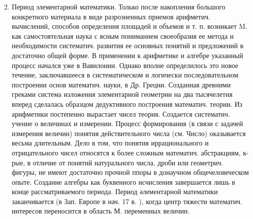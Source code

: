 \documentclass[10pt]{article}
\begin{document}
\begin{enumerate}

  \setcounter{enumi}{1}

  \item Период элементарной математики. Только после накопления большого конкретного материала в виде разрозненных приемов арифметич. вычислений, способов определения площадей и объемов и т. п. возникает M. как самостоятельная наука с ясным пониманием своеобразия ее метода и необходимости систематич. развития ее основных понятий и предложений в достаточно общей форме. В применении к арифметике и алгебре указанный процесс начался уже в Вавилонии. Однако вполне определилось это новое течение, заключавшееся в систематическом и логически последовательном построении основ математич. науки, в Др. Греции. Созданная древними греками система изложения элементарной геометрии на два тысячелетия вперед сделалась образцом дедуктивного построения математич. теории. Из арифметики постепенно вырастает чисел теория. Создается систематич. учение о величинах и измерении. Процесс формирования (в связи с задачей измерения величин) понятия действительного числа (см. Число) оказывается весьма длительным. Дело в том, что понятия иррационального и отрицательного чисел относятся к более сложным математич. абстракциям, к-рые, в отличие от понятий натурального числа, дроби или геометрич. фигуры, не имеют достаточно прочной ппоры в донаучном общечеловеческом опыте. Создание алгебры как буквенного исчисления завершается лишь в конце рассматриваемого периода. Период әлементарной математики заканчивается (в Зап. Европе в нач. 17 в. ), когда центр тяжести математич. интересов переносится в область М. переменных величин.




\end{enumerate}
\end{document}
